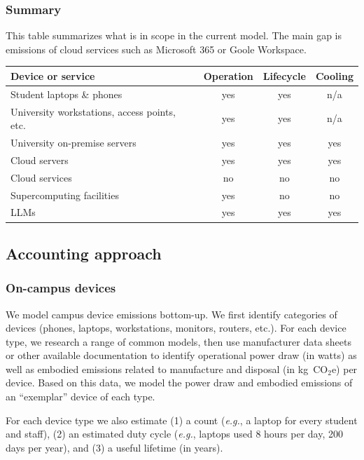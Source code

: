 \documentclass[11pt]{article}
\newcommand{\eg}{{\em e.g.}}
\newcommand{\coe}{CO$_2$e}
\newcommand{\gcoe}{g~\coe}
\newcommand{\kgcoe}{k\gcoe}
\begin{document}
\subsubsection*{Summary}

This table summarizes what is in scope in the current model. The main gap is emissions of cloud services such as Microsoft 365 or Goole Workspace.

\begin{center}
  \begin{tabular}{|l|c|c|c|}
    \hline
    \textbf{Device or service} & \textbf{Operation} & \textbf{Lifecycle} & \textbf{Cooling} \\ \hline
    Student laptops \& phones & yes & yes & n/a \\
    University workstations, access points, etc. & yes & yes & n/a \\
    University on-premise servers & yes & yes & yes \\
    Cloud servers & yes & yes & yes \\
    Cloud services & no & no & no \\
    Supercomputing facilities & yes & no & no \\
    LLMs & yes & yes & yes \\ \hline
  \end{tabular}
  \label{tab:scopes}
\end{center}

\subsection{Accounting approach}

\subsubsection*{On-campus devices}

We model campus device emissions bottom-up. We first identify categories of devices (phones, laptops, workstations, monitors, routers, etc.). For each device type, we research a range of common models, then use manufacturer data sheets or other available documentation to identify operational power draw (in watts) as well as embodied emissions related to manufacture and disposal (in \kgcoe) per device. Based on this data, we model the power draw and embodied emissions of an ``exemplar'' device of each type.

For each device type we also estimate (1) a count (\eg, a laptop for every student and staff), (2) an estimated duty cycle (\eg, laptops used 8 hours per day, 200 days per year), and (3) a useful lifetime (in years).
\end{document}
